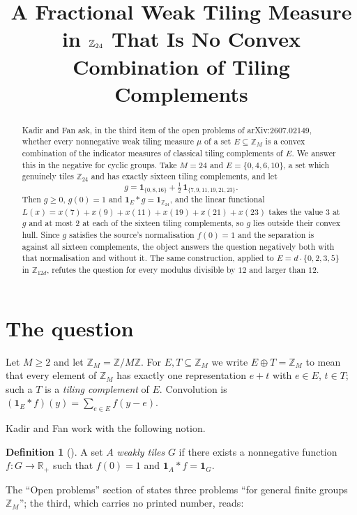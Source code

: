 \documentclass[11pt]{amsart}
\title[A fractional weak tiling measure in $\Zn{24}$]
{A Fractional Weak Tiling Measure in $\Zn{24}$
 That Is No Convex Combination of Tiling Complements}
\date{}
\theoremstyle{definition}
\newtheorem*{definition}{Definition}
\theoremstyle{remark}
\newcommand{\ZM}{\mathbb Z_M}
\newcommand{\Zn}[1]{\mathbb Z_{#1}}
\newcommand{\one}{\mathbf 1}
\begin{document}
\begin{abstract}
Kadir and Fan ask, in the third item of the open problems of
arXiv:2607.02149, whether every nonnegative weak tiling measure $\mu$ of a set
$E\subseteq\ZM$ is a convex combination of the indicator measures of classical
tiling complements of $E$. We answer this in the negative for cyclic groups.
Take $M=24$ and $E=\{0,4,6,10\}$, a set which genuinely tiles $\Zn{24}$ and has
exactly sixteen tiling complements, and let
\[
  g=\one_{\{0,8,16\}}+\tfrac12\,\one_{\{7,9,11,19,21,23\}} .
\]
Then $g\ge0$, $g(0)=1$ and $\one_E*g=\one_{\Zn{24}}$, and the linear functional
$L(x)=x(7)+x(9)+x(11)+x(19)+x(21)+x(23)$ takes the value $3$ at $g$ and at most
$2$ at each of the sixteen tiling complements, so $g$ lies outside their convex
hull. Since $g$ satisfies the source's normalisation $f(0)=1$ and the separation
is against all sixteen complements, the object answers the question negatively
both with that normalisation and without it. The same construction, applied to
$E=d\cdot\{0,2,3,5\}$ in $\Zn{12d}$, refutes the question for every modulus
divisible by $12$ and larger than $12$.
\end{abstract}

\maketitle

\section{The question}

Let $M\ge 2$ and let $\ZM=\mathbb Z/M\mathbb Z$. For $E,T\subseteq\ZM$ we write
$E\oplus T=\ZM$ to mean that every element of $\ZM$ has exactly one
representation $e+t$ with $e\in E$, $t\in T$; such a $T$ is a
\emph{tiling complement} of $E$. Convolution is
$(\one_E*f)(y)=\sum_{e\in E}f(y-e)$.

Kadir and Fan \cite{KF} work with the following notion.

\begin{definition}[\cite{KF}]
A set $A$ \emph{weakly tiles} $G$ if there exists a nonnegative function
$f\colon G\to\mathbb R_+$ such that $f(0)=1$ and $\one_A*f=\one_G$.
\end{definition}

The ``Open problems'' section of \cite{KF} states three problems ``for general
finite groups $\ZM$''; the third, which carries no printed number, reads:
\end{document}
